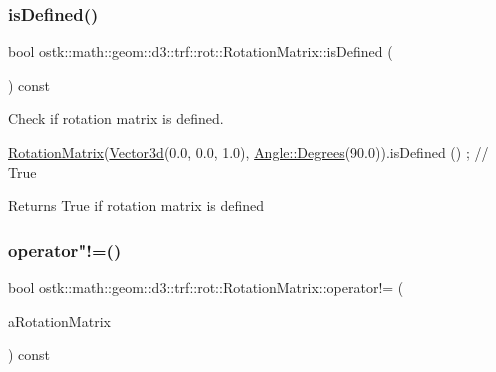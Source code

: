 \subsubsection{\texorpdfstring{is\+Defined()}{isDefined()}}
{\footnotesize\ttfamily bool ostk\+::math\+::geom\+::d3\+::trf\+::rot\+::\+Rotation\+Matrix\+::is\+Defined (\begin{DoxyParamCaption}{ }\end{DoxyParamCaption}) const}



Check if rotation matrix is defined. 


\begin{DoxyCode}
\hyperlink{classostk_1_1math_1_1geom_1_1d3_1_1trf_1_1rot_1_1_rotation_matrix_a5e6bed0779ad7db0c5bf26b2bd96f8ba}{RotationMatrix}(\hyperlink{namespaceostk_1_1math_1_1obj_a18744cbf433bce59f6758d9fe3b1dff1}{Vector3d}(0.0, 0.0, 1.0), \hyperlink{classostk_1_1math_1_1geom_1_1_angle_a2cefda601167af07f61f0477776203ca}{Angle::Degrees}(90.0)).isDefined
      () ; \textcolor{comment}{// True}
\end{DoxyCode}


\begin{DoxyReturn}{Returns}
True if rotation matrix is defined 
\end{DoxyReturn}
\mbox{\label{classostk_1_1math_1_1geom_1_1d3_1_1trf_1_1rot_1_1_rotation_matrix_a568d249ecc7071d8bb0d7a903221ee79}} 
\subsubsection{\texorpdfstring{operator"!=()}{operator!=()}}
{\footnotesize\ttfamily bool ostk\+::math\+::geom\+::d3\+::trf\+::rot\+::\+Rotation\+Matrix\+::operator!= (\begin{DoxyParamCaption}\item[{const \hyperlink{classostk_1_1math_1_1geom_1_1d3_1_1trf_1_1rot_1_1_rotation_matrix}{Rotation\+Matrix} \&}]{a\+Rotation\+Matrix }\end{DoxyParamCaption}) const}



